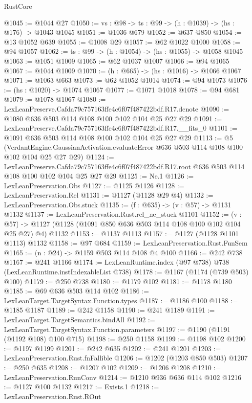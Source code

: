 \begin{lexlean}{RustCore}
\begin{coremodule}
@1045 := @1044 @27
@1050 := {vs : @98} -> {ts : @99} -> (h : @1039) -> (hs : @176) -> @1043 @1045
@1051 := @1036 @679
@1052 := @637 @850
@1054 := @13 @1052 @639
@1055 := @1008 @29
@1057 := @62 @1022 @1000
@1058 := @94 @1057
@1062 := {ts : @99} -> (h : @1054) -> (hs : @1055) -> @1058 @1045
@1063 := @1051 @1009
@1065 := @62 @1037 @1007
@1066 := @94 @1065
@1067 := @1044 @1009
@1070 := (h : @665) -> (hs : @1016) -> @1066 @1067
@1071 := @1063 @663
@1073 := @62 @1052 @1014
@1074 := @94 @1073
@1076 := (hs : @1020) -> @1074 @1067
@1077 := @1071 @1018
@1078 := @94 @681
@1079 := @1078 @1067
@1080 := LexLeanPreserve.Cafda79c757163ffe4c6f07f487422bdf.R17.denote
@1090 := @1080 @636 @503 @114 @108 @100 @102 @104 @25 @27 @29
@1091 := LexLeanPreserve.Cafda79c757163ffe4c6f07f487422bdf.R17.__fits_0
@1101 := @1091 @636 @503 @114 @108 @100 @102 @104 @25 @27 @29
@1113 := @5
    (VerdantEngine.GaussianActivation.evaluateError @636 @503 @114 @108 @100 @102 @104 @25 @27 @29)
@1124 := LexLeanPreserve.Cafda79c757163ffe4c6f07f487422bdf.R17.root
    @636
    @503
    @114
    @108
    @100
    @102
    @104
    @25
    @27
    @29
@1125 := Ne.{1}
@1126 := LexLeanPreservation.Obs
@1127 := @1125 @1126
@1128 := LexLeanPreservation.Rel
@1131 := @1127 (@1128 @29 @4)
@1132 := LexLeanPreservation.Obs.stuck
@1135 := (f : @635) -> (v : @57) -> @1131 @1132
@1137 := LexLeanPreservation.Rust.rel_ne_stuck @1101
@1152 := (v : @57) -> @1127 (@1128 (@1091 @850 @636 @503 @114 @108 @100 @102 @104 @25 @27) @4) @1132
@1153 := @1137 @1113
@1157 := @1127 (@1128 @1101 @1113) @1132
@1158 := @97 @684
@1159 := LexLeanPreservation.Rust.FunSem
@1165 := (n : @24) -> @1159 @503 @114 @108 @4 @100
@1166 := @242 @738
@1167 := @241 @1166
@1174 := LexLeanRuntime.index (@97 @738) @738 (LexLeanRuntime.instIndexableList @738)
@1178 := @1167 (@1174 (@739 @503) @100)
@1179 := @250 @738
@1180 := @1179 @102
@1181 := @1178 @1180
@1185 := @69 @636 @503 @114 @102
@1186 := LexLeanTarget.TargetSyntax.Function.types
@1187 := @1186 @100
@1188 := @1185 @1187
@1189 := @242 @1158
@1190 := @241 @1189
@1191 := LexLeanTarget.TargetSemantics.bindAll
@1192 := LexLeanTarget.TargetSyntax.Function.parameters
@1197 := @1190 (@1191 (@1192 @108) @100 @715)
@1198 := @250 @1158
@1199 := @1198 @102
@1200 := @1197 @1199
@1201 := @242 @635
@1202 := @241 @1201
@1203 := LexLeanPreservation.Rust.fnFallible
@1206 := @1202 (@1203 @850 @503)
@1207 := @250 @635
@1208 := @1207 @102
@1209 := @1206 @1208
@1210 := LexLeanPreservation.RunConv
@1214 := @1210 @936 @636 @114 @102
@1216 := @1127 @100 @1132
@1217 := Exists.{1}
@1218 := LexLeanPreservation.Rust.ROut

\end{coremodule}
\end{lexlean}
